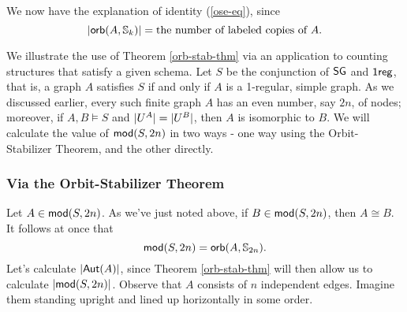 We now have the explanation of identity (\ref{ose-eq}), since 
\[
\mbox{$|\mbox{$\mathsf{orb}(A,\mbox{$\mathbb{S}_{k}$})$}|$}=\mbox{the number of labeled copies of }A.
\]

We illustrate the use of Theorem \ref{orb-stab-thm} via an application to counting structures that satisfy a given schema. %
Let $S$ be the conjunction of $\mbox{$\mathsf{SG}$}$ and $\mbox{$\mathsf{1reg}$}$, that is, a graph $A$ satisfies $S$ if and only if $A$ is a 1-regular, simple graph. As we discussed earlier, every such finite graph $A$ has an even number, say $2n$, of nodes; moreover, if $A,B\models S$ and $\mbox{$|U^A|$}=\mbox{$|U^B|$}$, then $A$ is isomorphic to $B$. We will calculate the value of $\mbox{$\mathsf{mod}(S,2n)$}$ in two ways - one way using the Orbit-Stabilizer Theorem, and the other directly. 

\subsubsection*{Via the Orbit-Stabilizer Theorem}
Let $A\in\mbox{$\mathsf{mod}(S,2n)$}$. As we've just noted above, if $B\in\mbox{$\mathsf{mod}(S,2n)$}$, then $A\cong B$. It follows at once that 
\begin{equation}\label{vos-eq}
\mbox{$\mathsf{mod}(S,2n)$}=\mbox{$\mathsf{orb}(A,\mbox{$\mathbb{S}_{2n}$})$}.
\end{equation}
Let's calculate $\mbox{$|\mbox{$\mathsf{Aut}(A)$}|$}$, since Theorem \ref{orb-stab-thm} will then allow us to calculate $\mbox{$|\mbox{$\mathsf{mod}(S,2n)$}|$}$. Observe that $A$ consists of $n$ independent edges. Imagine them standing upright and lined up horizontally in some order. 

\begin{center}
\end{center}

